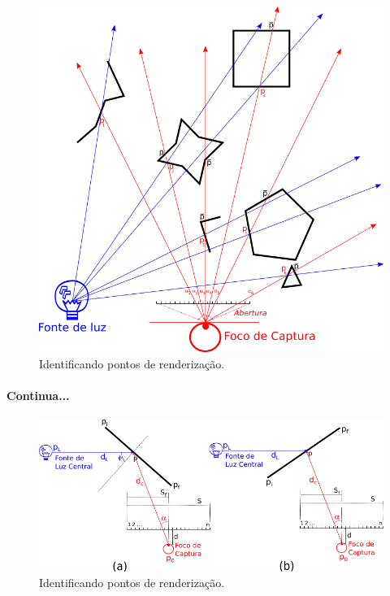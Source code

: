 \documentclass{article}
\begin{document}
	\begin{figure}[h]
		\centering
		\includegraphics[scale=0.8]{Renderizacao-2D-1D-radial}
		\caption{Identificando pontos de renderização.}
		\label{fig:rend-rad}
	\end{figure}
	
	\paragraph{}
	\textbf{Continua...}
	
	\paragraph{}
	\begin{figure}[h]
		\centering
		\includegraphics[scale=0.7]{radiosity-radial}
		\caption{Identificando pontos de renderização.}
		\label{fig:radio-rad}
	\end{figure}
\end{document}
